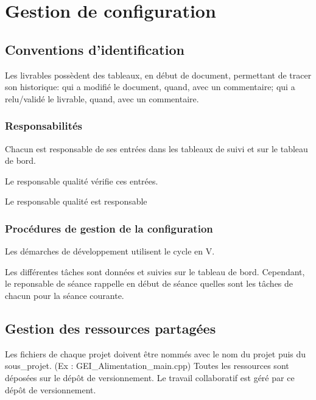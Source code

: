 \section{Gestion de configuration}

\subsection{Conventions d'identification}
Les livrables possèdent des tableaux, en début de document, permettant
de tracer son historique: qui a modifié le document, quand, avec un
commentaire; qui a relu/validé le livrable, quand, avec un commentaire.

\subsubsection{Responsabilités}

Chacun est responsable de ses entrées dans les tableaux de suivi et sur le 
tableau de bord.

Le responsable qualité vérifie ces entrées.

Le responsable qualité est responsable 

\subsubsection{Procédures de gestion de la configuration}

Les démarches de développement utilisent le cycle en V.

Les différentes tâches sont données et suivies sur le tableau de bord. Cependant, 
le reponsable de séance rappelle en début de séance quelles sont les tâches de 
chacun pour la séance courante.

\subsection{Gestion des ressources partagées}

Les fichiers de chaque projet doivent être nommés avec le nom du projet puis du 
sous_projet. (Ex : GEI_Alimentation_main.cpp)
Toutes les ressources sont déposées sur le dépôt de versionnement. Le travail 
collaboratif est géré par ce dépôt de versionnement.

